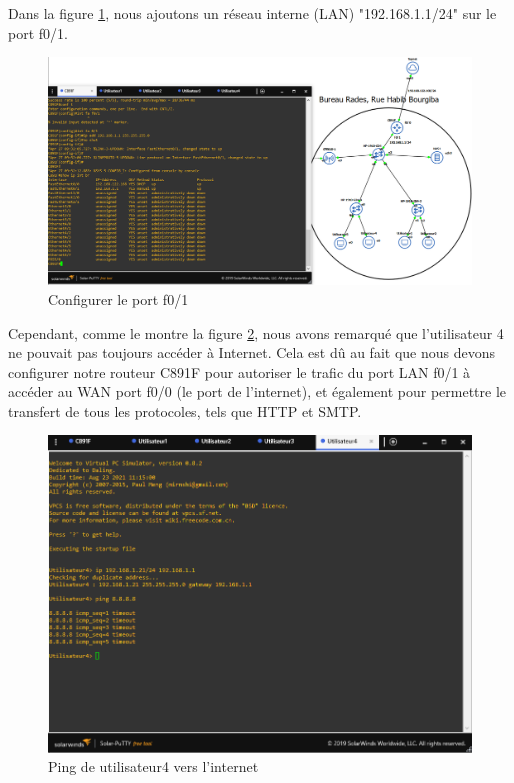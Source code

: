 Dans la figure \ref{Chap2.2.4}, nous ajoutons un réseau interne (LAN) "192.168.1.1/24" sur le port f0/1. 

\begin{figure}[H]
 \centering
    \includegraphics[width=16cm]{Images/BRades-Topologie4.png}
    \caption{Configurer le port f0/1}
    \label{Chap2.2.4}
\end{figure}

Cependant, comme le montre la figure \ref{Chap2.2.5}, nous avons remarqué que l'utilisateur 4 ne pouvait pas toujours accéder à Internet. Cela est dû au fait que nous devons configurer notre routeur C891F pour autoriser le trafic du port LAN f0/1 à accéder au WAN port f0/0 (le port de l'internet), et également pour permettre le transfert de tous les protocoles, tels que HTTP et SMTP.




\begin{figure}[H]
 \centering
    \includegraphics[width=16cm]{Images/BRades-Topologie5.png}
    \caption{Ping de utilisateur4 vers l'internet}
    \label{Chap2.2.5}
\end{figure}


